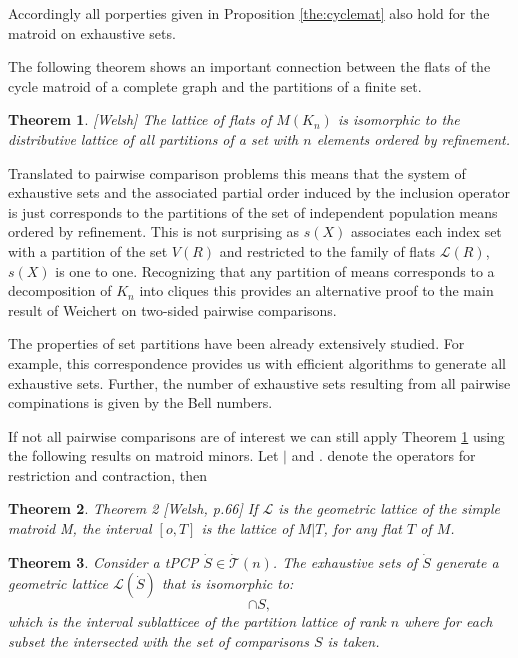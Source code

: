 \documentclass[a4paper,12pt]{article}
\newtheorem{theorem}{Theorem}
\begin{document}
Accordingly all porperties given in Proposition \ref{the:cyclemat} also hold for
the matroid on exhaustive sets. 

The following theorem shows an important connection between the flats
of the cycle matroid of a complete graph and the partitions of a
finite set. 

\begin{theorem}{[Welsh]}
\label{the:partition.lattice}
  The lattice of flats of $M(K_n)$ is isomorphic to the distributive
  lattice of all partitions of a set with $n$ elements ordered by
  refinement. 
\end{theorem}

Translated to pairwise comparison problems this means that the system
of exhaustive sets and the associated partial order induced by the 
inclusion operator is just corresponds to the partitions of the set of
independent population means ordered by refinement. This is not
surprising as $s(X)$ associates each index set with a partition of the
set $V(R)$ and restricted to the family of flats $\mathcal{L}(R)$,
$s(X)$ is one to one. Recognizing that any partition of means
corresponds to a decomposition of $K_n$ into cliques this provides an
alternative proof to the main result of Weichert on two-sided pairwise
comparisons. 

The properties of set partitions have been already extensively
studied. For example, this correspondence provides us with efficient
algorithms to generate all exhaustive sets. Further, the number of
exhaustive sets resulting from all pairwise compinations is given by
the Bell numbers.

If not all pairwise comparisons are of interest we can still apply
Theorem \ref{the:partition.lattice} using the following results on
matroid minors. Let $|$ and $.$ denote the operators for restriction
and contraction, then

\begin{theorem}{Theorem 2 [Welsh, p.66]}
  If $\mathcal{L}$ is the geometric lattice of the simple matroid M,
  the interval $[o,T]$ is the lattice of $M|T$, for any flat $T$ of
  $M$. 
\end{theorem}

\begin{theorem}
\label{the:interval}
  Consider a tPCP $\dot{S} \in \dot{\mathcal{T}}(n)$. The exhaustive
  sets of $\dot{S}$ generate a geometric lattice
  $\mathcal{L}(\dot{S})$ that is isomorphic to: 
  \begin{displaymath}
    [\emptyset,\sigma_{K_n} S] \cap S,
  \end{displaymath}
  which is the interval sublatticee of the partition lattice of rank
  $n$ where for each subset the intersected with the set of
  comparisons $S$ is taken. 
\end{theorem}
\end{document}
